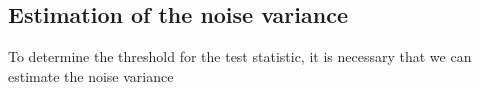 \documentclass[a4paper, openany, oneside]{memoir}
\begin{document}
\subsection{Estimation of the noise variance}
To determine the threshold for the test statistic, it is necessary that we can estimate the noise variance 

\end{document}

